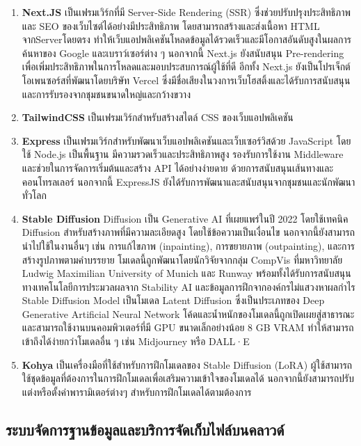\documentclass[12pt,oneside,openright,a4paper]{cpe-thai-project}
\begin{document}
\begin{enumerate}

  \item \textbf{Next.JS} เป็นเฟรมเวิร์กที่มี Server-Side Rendering (SSR) ซึ่งช่วยปรับปรุงประสิทธิภาพและ SEO ของเว็บไซต์ได้อย่างมีประสิทธิภาพ โดยสามารถสร้างและส่งเนื้อหา HTML จากServerโดยตรง ทำให้เว็บแอปพลิเคชันโหลดข้อมูลได้รวดเร็วและมีโอกาสอันดับสูงในผลการค้นหาของ Google และเบราว์เซอร์ต่าง ๆ นอกจากนี้ Next.js ยังสนับสนุน Pre-rendering เพื่อเพิ่มประสิทธิภาพในการโหลดและมอบประสบการณ์ผู้ใช้ที่ดี อีกทั้ง Next.js ยังเป็นโปรเจ็กต์โอเพนซอร์สที่พัฒนาโดยบริษัท Vercel ซึ่งมีชื่อเสียงในวงการเว็บโฮสติ้งและได้รับการสนับสนุนและการรับรองจากชุมชนขนาดใหญ่และกว้างขวาง
  \item \textbf{TailwindCSS} เป็นเฟรมเวิร์กสำหรับสร้างสไตล์ CSS ของเว็บแอปพลิเคชัน
  \item \textbf{Express} เป็นเฟรมเวิร์กสำหรับพัฒนาเว็บแอปพลิเคชันและเว็บเซอร์วิสด้วย JavaScript โดยใช้ Node.js เป็นพื้นฐาน มีความรวดเร็วและประสิทธิภาพสูง รองรับการใช้งาน Middleware และช่วยในการจัดการเริ่มต้นและสร้าง API ได้อย่างง่ายดาย ด้วยการสนับสนุนเส้นทางและคอนโทรลเลอร์ นอกจากนี้ ExpressJS ยังได้รับการพัฒนาและสนับสนุนจากชุมชนและนักพัฒนาทั่วโลก
  \item \textbf{Stable Diffusion} Diffusion เป็น Generative AI ที่เผยแพร่ในปี 2022 โดยใช้เทคนิค Diffusion สำหรับสร้างภาพที่มีความละเอียดสูง โดยใช้ข้อความเป็นเงื่อนไข นอกจากนี้ยังสามารถนำไปใช้ในงานอื่นๆ เช่น การแก้ไขภาพ (inpainting), การขยายภาพ (outpainting), และการสร้างรูปภาพตามคำบรรยาย โมเดลนี้ถูกพัฒนาโดยนักวิจัยจากกลุ่ม CompVis ที่มหาวิทยาลัย Ludwig Maximilian University of Munich และ Runway พร้อมทั้งได้รับการสนับสนุนทางเทคโนโลยีการประมวลผลจาก Stability AI และข้อมูลการฝึกจากองค์กรไม่แสวงหาผลกำไร Stable Diffusion Model เป็นโมเดล Latent Diffusion ซึ่งเป็นประเภทของ Deep Generative Artificial Neural Network โค้ดและน้ำหนักของโมเดลนี้ถูกเปิดเผยสู่สาธารณะและสามารถใช้งานบนคอมพิวเตอร์ที่มี GPU ขนาดเล็กอย่างน้อย 8 GB VRAM ทำให้สามารถเข้าถึงได้ง่ายกว่าโมเดลอื่น ๆ เช่น Midjourney หรือ DALL·E
  \item \textbf{Kohya} เป็นเครื่องมือที่ใช้สำหรับการฝึกโมเดลของ Stable Diffusion (LoRA) ผู้ใช้สามารถใช้ชุดข้อมูลที่ต้องการในการฝึกโมเดลเพื่อเสริมความเข้าใจของโมเดลได้ นอกจากนี้ยังสามารถปรับแต่งหรือตั้งค่าพารามิเตอร์ต่างๆ สำหรับการฝึกโมเดลได้ตามต้องการ

\end{enumerate}

\subsection{ระบบจัดการฐานข้อมูลและบริการจัดเก็บไฟล์บนคลาวด์}
\end{document}
